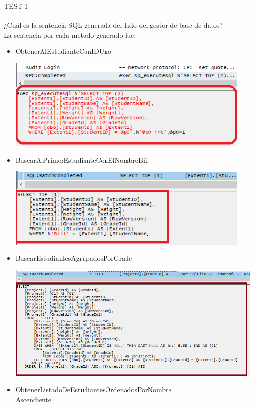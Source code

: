 TEST 1
\\\\
¿Cuál es la sentencia SQL generada del lado del gestor de base de datos?
\\ La sentencia por cada metodo generado fue: 
\begin{itemize}
	\item 	ObtenerAlEstudianteConIDUno
\begin{center}
\includegraphics[width=12cm]{./Imagenes/test1-1}
\end{center}
	\item 	 BuscarAlPrimerEstudianteConElNombreBill
\begin{center}
\includegraphics[width=12cm]{./Imagenes/test1-2}
\end{center}
	\item 	BuscarEstudiantesAgrupadosPorGrade
\begin{center}
\includegraphics[width=17cm]{./Imagenes/test1-3}
\end{center}
	\item 	 ObtenerListadoDeEstudiantesOrdenadosPorNombre
\\Ascendiente

\end{itemize}
